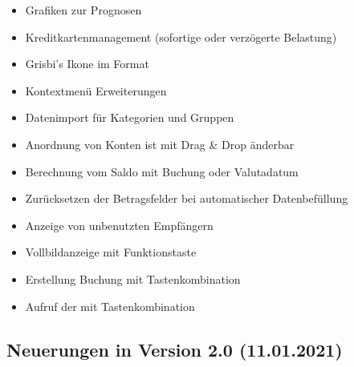 \begin{itemize}
	\item Grafiken zur Prognosen%
	\item Kreditkartenmanagement (sofortige oder verzögerte Belastung)%
	\item Grisbi's Ikone im Format %
	\item Kontextmenü Erweiterungen%
	\item Datenimport für Kategorien und Gruppen%
	\item Anordnung von Konten ist mit Drag \& Drop änderbar%
	\item Berechnung vom Saldo mit Buchung oder Valutadatum%
	\item Zurücksetzen der Betragsfelder bei automatischer Datenbefüllung%
	\item Anzeige von unbenutzten Empfängern%
	\item Vollbildanzeige mit Funktionstaste %
	\item Erstellung Buchung mit Tastenkombination %
	\item Aufruf der  mit Tastenkombination %
\end{itemize}


\subsection{Neuerungen in Version 2.0 \textnormal{(11.01.2021)}}%


